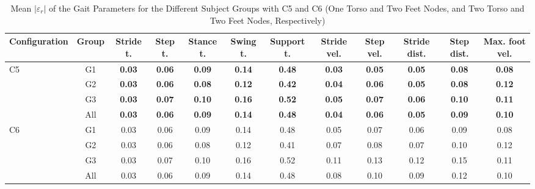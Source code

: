 \begin{table*}[b]
	\centering
	\caption{Mean $|\varepsilon_r|$ of the Gait Parameters for the Different Subject Groups with C5 and C6 (One Torso and Two Feet Nodes, and Two Torso and Two Feet Nodes, Respectively)}
	\label{tab:mean_error_opt}
	\begin{tabular}{@{}lccccccccccc@{}}
		\hline
	Configuration       & Group & Stride t.     & Step t.       & Stance t.     & Swing t.      & Support t.    & Stride vel.   & Step vel.     & Stride dist.  & Step dist.    & Max. foot vel. \\ \hline
	\multirow{4}{*}{C5} & G1    & \textbf{0.03} & \textbf{0.06} & \textbf{0.09} & \textbf{0.14} & \textbf{0.48} & \textbf{0.03} & \textbf{0.05} & \textbf{0.05} & \textbf{0.08} & \textbf{0.08}  \\
	& G2    & \textbf{0.03} & \textbf{0.06} & \textbf{0.08} & \textbf{0.12} & \textbf{0.42} & \textbf{0.04} & \textbf{0.06} & \textbf{0.05} & \textbf{0.08} & \textbf{0.12}  \\
	& G3    & \textbf{0.03} & \textbf{0.07} & \textbf{0.10} & \textbf{0.16} & \textbf{0.52} & \textbf{0.05} & \textbf{0.07} & \textbf{0.06} & \textbf{0.10} & \textbf{0.11}  \\
	& All   & \textbf{0.03} & \textbf{0.06} & \textbf{0.09} & \textbf{0.14} & \textbf{0.48} & \textbf{0.04} & \textbf{0.06} & \textbf{0.05} & \textbf{0.09} & \textbf{0.10}  \\ \hline
	\multirow{4}{*}{C6} & G1    & 0.03          & 0.06          & 0.09          & 0.14          & 0.48          & 0.05          & 0.07          & 0.06          & 0.09          & 0.08           \\
	& G2    & 0.03          & 0.06          & 0.08          & 0.12          & 0.41          & 0.07          & 0.08          & 0.07          & 0.10          & 0.12           \\
	& G3    & 0.03          & 0.07          & 0.10          & 0.16          & 0.52          & 0.11          & 0.13          & 0.12          & 0.15          & 0.11           \\
	& All   & 0.03          & 0.06          & 0.09          & 0.14          & 0.48          & 0.08          & 0.10          & 0.09          & 0.12          & 0.10           \\ \hline
    \end{tabular}
\end{table*}